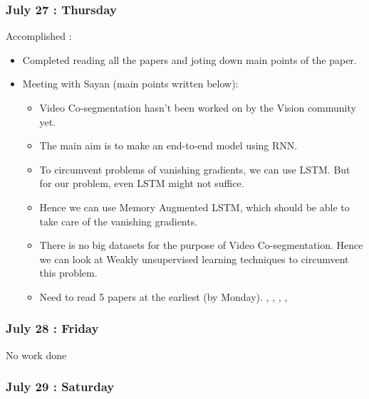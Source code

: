 \documentclass{article}
\begin{document}
\subsubsection{July 27 : Thursday}
Accomplished :
\begin{itemize}
\item Completed reading all the papers and joting down main points of the paper.
\item Meeting with Sayan (main points written below):
  \begin{itemize}
  \item Video Co-segmentation hasn't been worked on by the Vision community yet.
  \item The main aim is to make an end-to-end model using RNN.
  \item To circumvent problems of vanishing gradients, we can use LSTM. But for our problem, even LSTM might not suffice.
  \item Hence we can use Memory Augmented LSTM, which should be able to take care of the vanishing gradients.
  \item There is no big datasets for the purpose of Video Co-segmentation. Hence we can look at Weakly unsupervised learning techniques to circumvent this problem.
  \item Need to read 5 papers at the earliest (by Monday). \cite{DBLP:journals/corr/SiamVJR16}, \cite{DBLP:journals/corr/JainZSS15}, \cite{PAVEL2017105}, \cite{DBLP:journals/corr/NohHH15}, \cite{DBLP:journals/corr/GulcehreCB17}
  \end{itemize}
\end{itemize}

\subsubsection{July 28 : Friday}
No work done

\subsubsection{July 29 : Saturday}





\end{document}
